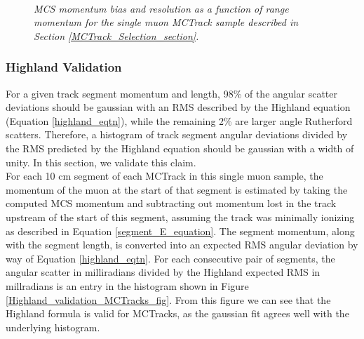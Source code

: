 \begin{figure}
\centering
\mbox{
	\quad
	}
\caption{\textit{MCS momentum bias and resolution as a function of range momentum for the single muon {\sc MCTrack} sample described in Section \ref{MCTrack_Selection_section}.}}
\label{MCS_range_bias_resolution_MCTrack_fig}
\end{figure}



\subsubsection{Highland Validation}\label{Highland_Validation_MCTrack_section}
For a given track segment momentum and length, 98\% of the angular scatter deviations should be gaussian with an RMS described by the Highland equation (Equation \ref{highland_eqtn}), while the remaining 2\% are larger angle Rutherford scatters\cite{highland}. Therefore, a histogram of track segment angular deviations divided by the RMS predicted by the Highland equation should be gaussian with a width of unity. In this section, we validate this claim.\\

For each 10 cm segment of each {\sc MCTrack} in this single muon sample, the momentum of the muon at the start of that segment is estimated by taking the computed MCS momentum and subtracting out momentum lost in the track upstream of the start of this segment, assuming the track was minimally ionizing as described in Equation \ref{segment_E_equation}. The segment momentum, along with the segment length, is converted into an expected RMS angular deviation by way of Equation \ref{highland_eqtn}. For each consecutive pair of segments, the angular scatter in milliradians divided by the Highland expected RMS in millradians is an entry in the histogram shown in Figure \ref{Highland_validation_MCTracks_fig}. From this figure we can see that the Highland formula is valid for {\sc MCTracks}, as the gaussian fit agrees well with the underlying histogram.

